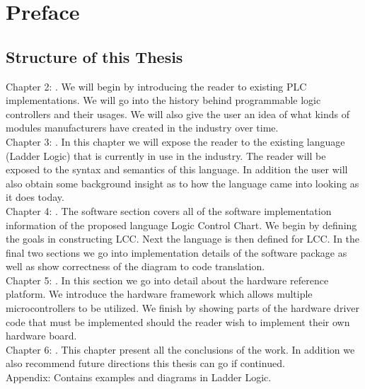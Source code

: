 
\chapter{Preface}

\section{Structure of this Thesis}

\noindent
Chapter 2: . We will begin by introducing the reader to existing PLC implementations. We will go into the history behind programmable logic controllers and their usages. We will also give the user an idea of what kinds of modules manufacturers have created in the industry over time.
\\

\noindent
Chapter 3: . In this chapter we will expose the reader to the existing language (Ladder Logic) that is currently in use in the industry. The reader will be exposed to the syntax and semantics of this language. In addition the user will also obtain some background insight as to how the language came into looking as it does today.
\\

\noindent
Chapter 4: . The software section covers all of the software implementation information of the proposed language Logic Control Chart. We begin by defining the goals in constructing LCC. Next the language is then defined for LCC. In the final two sections we go into implementation details of the software package as well as show correctness of the diagram to code translation.
\\

\noindent
Chapter 5: . In this section we go into detail about the hardware reference platform. We introduce the hardware framework which allows multiple microcontrollers to be utilized. We finish by showing parts of the hardware driver code that must be implemented should the reader wish to implement their own hardware board.
\\

\noindent
Chapter 6: . This chapter present all the conclusions of the work. In addition we also recommend future directions this thesis can go if continued.
\\

\noindent
Appendix: Contains examples and diagrams in Ladder Logic.